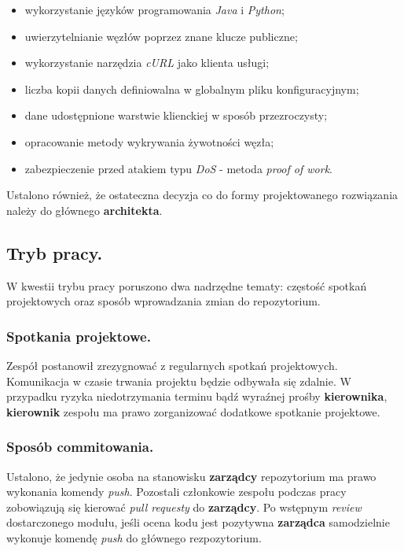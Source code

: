 \documentclass[a4paper,11pt]{article}
\begin{document}
  \begin{itemize}
    \item wykorzystanie języków programowania \textit{Java} i \textit{Python};
    \item uwierzytelnianie węzłów poprzez znane klucze publiczne;
    \item wykorzystanie narzędzia \textit{cURL} jako klienta usługi;
    \item liczba kopii danych definiowalna w globalnym pliku konfiguracyjnym;
    \item dane udostępnione warstwie klienckiej w sposób przezroczysty;
    \item opracowanie metody wykrywania żywotności węzła;
    \item zabezpieczenie przed atakiem typu \textit{DoS} - metoda \textit{proof of work}.
  \end{itemize}
  
  Ustalono również, że ostateczna decyzja co do formy projektowanego rozwiązania należy do głównego \textbf{architekta}.

\subsection{Tryb pracy.}
  W kwestii trybu pracy poruszono dwa nadrzędne tematy: częstość spotkań projektowych oraz sposób wprowadzania zmian do repozytorium.
  
\subsubsection{Spotkania projektowe.}
  Zespół postanowił zrezygnować z regularnych spotkań projektowych.
  Komunikacja w czasie trwania projektu będzie odbywała się zdalnie.
  W przypadku ryzyka niedotrzymania terminu bądź wyraźnej prośby \textbf{kierownika}, \textbf{kierownik} zespołu ma prawo zorganizować dodatkowe spotkanie projektowe.

\subsubsection{Sposób commitowania.}
  Ustalono, że jedynie osoba na stanowisku \textbf{zarządcy} repozytorium ma prawo wykonania komendy \textit{push}.
  Pozostali członkowie zespołu podczas pracy zobowiązują się kierować \textit{pull requesty} do \textbf{zarządcy}.
  Po wstępnym \textit{review} dostarczonego modułu, jeśli ocena kodu jest pozytywna \textbf{zarządca} samodzielnie wykonuje komendę \textit{push} do głównego rezpozytorium.
  
\end{document}
